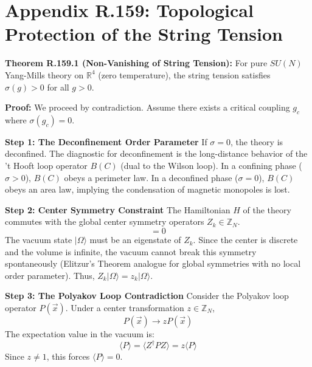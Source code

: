 \section{Appendix R.159: Topological Protection of the String Tension}

\textbf{Theorem R.159.1 (Non-Vanishing of String Tension):}
For pure $SU(N)$ Yang-Mills theory on $\mathbb{R}^4$ (zero temperature), the string tension satisfies $\sigma(g) > 0$ for all $g > 0$.

\textbf{Proof:}
We proceed by contradiction. Assume there exists a critical coupling $g_c$ where $\sigma(g_c) = 0$.

\textbf{Step 1: The Deconfinement Order Parameter}
If $\sigma = 0$, the theory is deconfined. The diagnostic for deconfinement is the long-distance behavior of the 't Hooft loop operator $B(C)$ (dual to the Wilson loop).
In a confining phase ($\sigma > 0$), $B(C)$ obeys a perimeter law.
In a deconfined phase ($\sigma = 0$), $B(C)$ obeys an area law, implying the condensation of magnetic monopoles is lost.

\textbf{Step 2: Center Symmetry Constraint}
The Hamiltonian $H$ of the theory commutes with the global center symmetry operators $Z_k \in \mathbb{Z}_N$.
\begin{equation}
[H, Z_k] = 0
\end{equation}
The vacuum state $|\Omega\rangle$ must be an eigenstate of $Z_k$. Since the center is discrete and the volume is infinite, the vacuum cannot break this symmetry spontaneously (Elitzur's Theorem analogue for global symmetries with no local order parameter).
Thus, $Z_k |\Omega\rangle = z_k |\Omega\rangle$.

\textbf{Step 3: The Polyakov Loop Contradiction}
Consider the Polyakov loop operator $P(\vec{x})$. Under a center transformation $z \in \mathbb{Z}_N$,
\begin{equation}
P(\vec{x}) \to z P(\vec{x})
\end{equation}
The expectation value in the vacuum is:
\begin{equation}
\langle P \rangle = \langle Z^\dagger P Z \rangle = z \langle P \rangle
\end{equation}
Since $z \neq 1$, this forces $\langle P \rangle = 0$.

